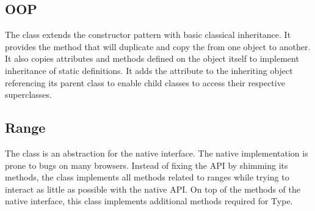 \subsection{OOP}
\label{sec:oop_class}

The  class extends the constructor pattern with basic classical inheritance. It provides the method  that will duplicate and copy the  from one  object to another. It also copies attributes and methods defined on the  object itself to implement inheritance of static definitions. It adds the attribute  to the inheriting  object referencing its parent class to enable child classes to access their respective superclasses.




\subsection{Range}

The  class is an abstraction for the native  interface. The native implementation is prone to bugs on many browsers. Instead of fixing the API by shimming its methods, the  class implements all methods related to ranges while trying to interact as little as possible with the native API. On top of the methods of the native  interface, this class implements additional methods required for Type.









